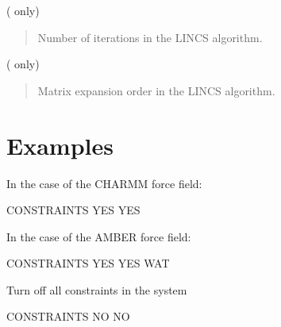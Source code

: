 \documentclass[a4paper,11pt,oneside,english]{sphinxmanual}
\begin{document}
  ( only)
\begin{quote}


Number of iterations in the LINCS algorithm.
\end{quote}

  ( only)
\begin{quote}


Matrix expansion order in the LINCS algorithm.
\end{quote}


\section{Examples}
\label{\detokenize{08_Constraints:examples}}
In the case of the CHARMM force field:

\begin{sphinxVerbatim}[commandchars=\\\{\}]
\PYG{o}{[}CONSTRAINTS\PYG{o}{]}
   YES   
   YES   
\end{sphinxVerbatim}

In the case of the AMBER force field:

\begin{sphinxVerbatim}[commandchars=\\\{\}]
\PYG{o}{[}CONSTRAINTS\PYG{o}{]}
   YES   
   YES   
  WAT   
\end{sphinxVerbatim}

Turn off all constraints in the system

\begin{sphinxVerbatim}[commandchars=\\\{\}]
\PYG{o}{[}CONSTRAINTS\PYG{o}{]}
   NO
   NO
\end{sphinxVerbatim}
\end{document}

